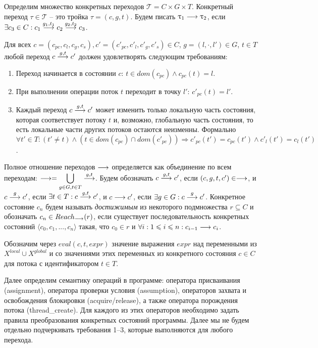 Определим множество конкретных переходов $\mathcal{T}=C\times G \times T$.
Конкретный переход $\tau \in \mathcal{T}$ -- это тройка $\tau = (c, g, t)$. 
Будем писать $\uptau_1 \longrightarrow \uptau_2$, если $\exists c_3 \in C: c_1 \stackrel{g_1, t_1}{\longrightarrow} c_2 \stackrel{g_2, t_2}{\longrightarrow} c_3$.

Для всех $c=(c_{pc}, c_l, c_g, c_s), c'=(c'_{pc}, c'_l, c'_g, c'_s) \in C$, $g = (l, \cdot, l')\in G$, $t\in T$ любой переход $c \stackrel{g, t}{\longrightarrow} c'$ должен удовлетворять следующим требованиям:
\begin{enumerate}
\item Переход начинается в состоянии $c$: $t\in dom(c_{pc}) \land c_{pc}(t)=l$.
\item При выполнении операции поток $t$ переходит в точку $l'$: $c'_{pc}(t)=l'$.
\item Каждый переход $c \stackrel{g,t}{\longrightarrow} c'$ может изменить только локальную часть состояния, которая соответствует потоку $t$ и, возможно, глобальную часть состояния, то есть локальные части других потоков остаются неизменны.
Формально
$\forall t'\in T: (t'\neq t) \land (t \in dom(c_{pc})\cap dom(c'_{pc})) \Rightarrow c'_{pc}(t')=c_{pc}(t') \land c'_l(t')=c_l(t')$.
\end{enumerate}

Полное отношение переходов $\longrightarrow$ определяется как объединение по всем переходам: 
$\longrightarrow = \displaystyle\bigcup_{g \in G,t \in T} \stackrel{g,t}{\longrightarrow}$.
Будем обозначать $c \stackrel{g, t}{\longrightarrow} c'$, если $(c, g, t, c') \in \longrightarrow$, и
$c \stackrel{g}{\longrightarrow} c'$, если $\exists t\in T: c \stackrel{g,t}{\longrightarrow} c'$, и 
$c \longrightarrow c'$, если $\exists g\in G: c \stackrel{g}{\longrightarrow} c'$. 
Конкретное состояние $c_n$ будем называть \textit{достижимым} из некоторого подмножества $r \subseteq C$ и обозначать $c_n \in Reach_{\longrightarrow}(r)$, если существует последовательность конкретных состояний $\langle c_0, c_1, ..., c_n \rangle$ такая, что $c_0 \in r$ и $\forall i : 1 \leqslant i \leqslant n : c_{i-1} \longrightarrow c_i$.

Обозначим через $eval(c, t, expr)$ значение выражения $expr$ над переменными из $X^{local} \cup X^{global}$ и со значениями этих переменных из конкретного состояния $c \in C$ для потока с идентификатором $t \in T$. %

Далее определим семантику операций в программе: оператора присваивания (assignment), оператора проверки условия (assumption), операторов захвата и освобождения блокировки (acquire/release), а также оператора порождения потока (thread\_create).
Для каждого из этих операторов необходимо задать правила преобразования конкретных состояний программы.
Далее мы не будем отдельно подчеркивать требования 1--3, которые выполняются для любого перехода.

